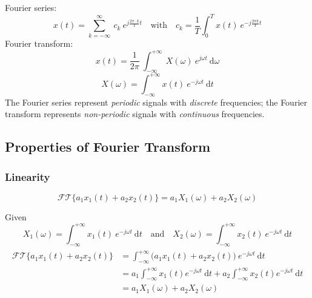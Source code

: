 \begin{tcolorbox}[title=Compare Fourier series and Fourier transform, breakable]
    Fourier series:
    \[ 
    x(t) =  \sum_{k=-\infty}^{\infty} \ c_{k} \ e^{j\frac{2\pi\cdot k}{T}t} \quad \text{with} \quad c_{k} = \frac{1}{T} \int_{0}^{T} x(t) \ e^{-j\frac{2\pi k}{T}t} 
    \]
    Fourier transform:
    \[ 
    x(t) = \frac{1}{2 \pi} \ \int_{-\infty}^{+\infty} \ X( \omega) \ e^{j \omega t} \ \mathrm{d}\omega 
    \]
    \[ 
    X(\omega) =  \int_{-\infty}^{+\infty} x(t) \ e^{-j \omega t} \ \mathrm{d}t 
    \]
    The Fourier series represent \textit{periodic} signals with \textit{discrete} frequencies; the Fourier transform represents \textit{non-periodic} signals with \textit{continuous} frequencies.
\end{tcolorbox}

\subsection{Properties of Fourier Transform}

\subsubsection{Linearity}
\[ \mathcal{FT} \{ a_{1}x_{1}(t)+a_{2}x_{2}(t)\} = a_{1}X_{1}(\omega)+a_{2}X_{2}(\omega) \]
\begin{dv}{}
    Given
    \[ 
    X_{1}(\omega) =  \int_{-\infty}^{+\infty} x_{1}(t) \ e^{-j \omega t} \ \mathrm{d}t \quad \text{and} \quad X_{2}(\omega) =  \int_{-\infty}^{+\infty} x_{2}(t) \ e^{-j \omega t} \ \mathrm{d}t 
    \]
    \begin{align*}
    \begin{split}
        \mathcal{FT} \{ a_{1}x_{1}(t)+a_{2}x_{2}(t) \} 
        &= \int_{-\infty}^{+\infty} \big( a_{1}x_{1}(t)+a_{2}x_{2}(t)\big) \ e^{-j \omega t} \ \mathrm{d}t  \\
        &= a_{1}\int_{-\infty}^{+\infty}x_{1}(t)e^{-j \omega t} \ \mathrm{d}t + a_{2}\int_{-\infty}^{+\infty}x_{2}(t) e^{-j \omega t} \ \mathrm{d}t \\
        &= a_{1}X_{1}(\omega)+a_{2}X_{2}(\omega)
    \end{split} 
    \end{align*} 
\end{dv}

